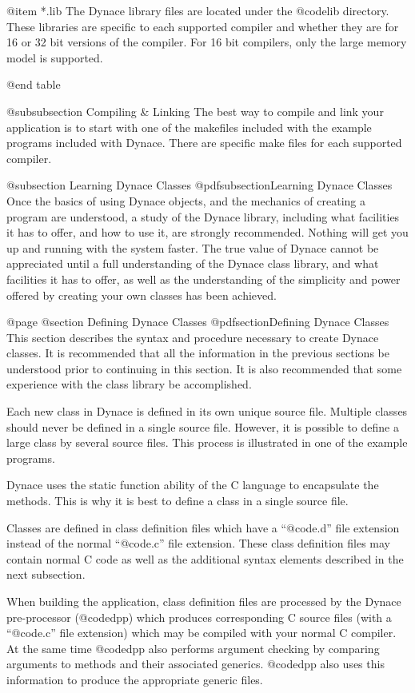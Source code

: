 @item *.lib
The Dynace library files are located under the @code{lib} directory.
These libraries are specific to each supported compiler and whether
they are for 16 or 32 bit versions of the compiler.  For 16 bit
compilers, only the large memory model is supported.

@end table

@subsubsection Compiling & Linking
The best way to compile and link your application is to start with one
of the makefiles included with the example programs included with Dynace.
There are specific make files for each supported compiler.

@subsection Learning Dynace Classes
@pdfsubsection{Learning Dynace Classes}
Once the basics of using Dynace objects, and the mechanics of creating a
program are understood, a study of the Dynace library, including what
facilities it has to offer, and how to use it, are strongly recommended.
Nothing will get you up and running with the system faster.  The true
value of Dynace cannot be appreciated until a full understanding of the Dynace
class library, and what facilities it has to offer, as well as the
understanding of the simplicity and power offered by creating your own
classes has been achieved.

@page
@section Defining Dynace Classes
@pdfsection{Defining Dynace Classes}
This section describes the syntax and procedure necessary to create
Dynace classes.  It is recommended that all the information in the
previous sections be understood prior to continuing in this section.  It
is also recommended that some experience with the class library be
accomplished.

Each new class in Dynace is defined in its own unique source file.
Multiple classes should never be defined in a single source file.
However, it is possible to define a large class by several source files.
This process is illustrated in one of the example programs.

Dynace uses the static function ability of the C language to encapsulate
the methods.  This is why it is best to define a class in a single
source file.

Classes are defined in class definition files which have a
``@code{.d}'' file extension instead of the normal ``@code{.c}''
file extension.  These class definition files may contain normal
C code as well as the additional syntax elements described in the
next subsection.

When building the application, class definition files are processed
by the Dynace pre-processor (@code{dpp}) which produces corresponding
C source files (with a ``@code{.c}'' file extension) which may be
compiled with your normal C compiler.  At the same time @code{dpp}
also performs argument checking by comparing arguments to methods
and their associated generics.  @code{dpp} also uses this information
to produce the appropriate generic files.


